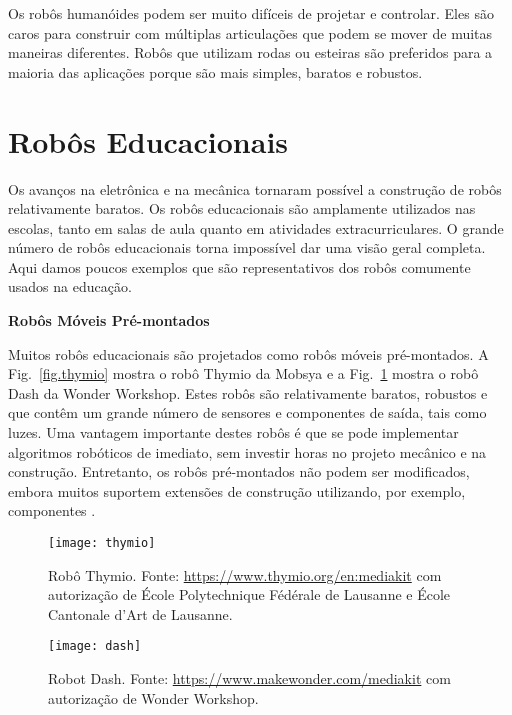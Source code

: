 \enlargethispage{\baselineskip}

Os robôs humanóides podem ser muito difíceis de projetar e controlar. Eles são caros para construir com múltiplas articulações que podem se mover de muitas maneiras diferentes. Robôs que utilizam rodas ou esteiras são preferidos para a maioria das aplicações porque são mais simples, baratos e robustos.

\section{Robôs Educacionais}\label{s.educational}

Os avanços na eletrônica e na mecânica tornaram possível a construção de robôs relativamente baratos. Os robôs educacionais são amplamente utilizados nas escolas, tanto em salas de aula quanto em atividades extracurriculares. O grande número de robôs educacionais torna impossível dar uma visão geral completa. Aqui damos poucos exemplos que são representativos dos robôs comumente usados na educação.

\smallskip

\noindent\textbf{Robôs Móveis Pré-montados}

Muitos robôs educacionais são projetados como robôs móveis pré-montados. A Fig.~\ref{fig.thymio} mostra o robô Thymio da Mobsya e a Fig.~\ref{fig.dash} mostra o robô Dash da Wonder Workshop. Estes robôs são relativamente baratos, robustos e que contêm um grande número de sensores e componentes de saída, tais como luzes. Uma vantagem importante destes robôs é que se pode implementar algoritmos robóticos de imediato, sem investir horas no projeto mecânico e na construção. Entretanto, os robôs pré-montados não podem ser modificados, embora muitos suportem extensões de construção utilizando, por exemplo, componentes \lego{}.

\begin{figure}
\begin{minipage}{.45\textwidth}
\begin{center}
\texttt{[image: thymio]}
\caption{Robô Thymio. Fonte: \protect\url{https://www.thymio.org/en:mediakit} com autorização  de \'{E}cole Polytechnique F\'{e}d\'{e}rale de Lausanne e \'{E}cole Cantonale d'Art de Lausanne.}\label{fig.thymio}
\end{center}
\end{minipage}
\hspace{\fill}
\begin{minipage}{.45\textwidth}
\begin{center}
\texttt{[image: dash]}
\caption{Robot Dash. Fonte: \protect\url{https://www.makewonder.com/mediakit} com autorização de Wonder Workshop.}\label{fig.dash}
\end{center}
\end{minipage}
\end{figure}

